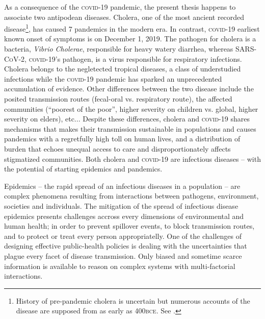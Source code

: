   As a consequence of the \textsc{covid}-19 pandemic, the present thesis happens to associate two antipodean diseases. Cholera, one of the most ancient recorded disease\footnote[][10\baselineskip]{History of pre-pandemic cholera is uncertain but numerous accounts of the disease are supposed from as early as 400\textsc{bce}. See .}, has caused 7 pandemics in the modern era. In contrast, \textsc{covid}-19 earliest known onset of symptoms is on December 1, 2019. The pathogen for cholera is a bacteria, \textit{Vibrio Cholerae}, responsible for heavy watery diarrhea, whereas \textsc{SARS-CoV-2}, \textsc{covid}-19’s pathogen, is a virus responsible for respiratory infections. Cholera belongs to the negletected tropical diseases, a class of understudied infections while the \textsc{covid}-19 pandemic has sparked an unprecedented accumulation of evidence. 
Other differences between the two disease include the posited transmission routes (fecal-oral vs. respiratory route), the affected communities (``poorest of the poor”, higher severity on children vs. global, higher severity on elders), etc... Despite these differences, cholera and \textsc{covid}-19 shares mechanisms that makes their transmission sustainable in populations and causes pandemics with a regretfully high toll on human lives, and a distribution of burden that echoes unequal access to care and disproportionately affects stigmatized communities. Both cholera and \textsc{covid}-19 are infectious diseases -- with the potential of starting epidemics and pandemics.%

 
Epidemics -- the rapid spread of an infectious diseases in a population -- are  complex phenomena resulting from interactions between pathogens, environment, societies and individuals\cite{Rinaldo:RiverNetworksEcological:2020a, Buckee:ThinkingClearlySocial:2021, Heesterbeek:ModelingInfectiousDisease:2015}. The mitigation of the spread of infectious disease epidemics presents challenges accross every dimensions of environmental and human health; in order to prevent spillover events, to block transmission routes, and to protect or treat every person appropriatelly. %
 One of the challenges of designing effective public-health policies is dealing with the uncertainties that plague every facet of disease transmission. Only biased and sometime scarce information is available to reason on complex systems with multi-factorial interactions. 
 
